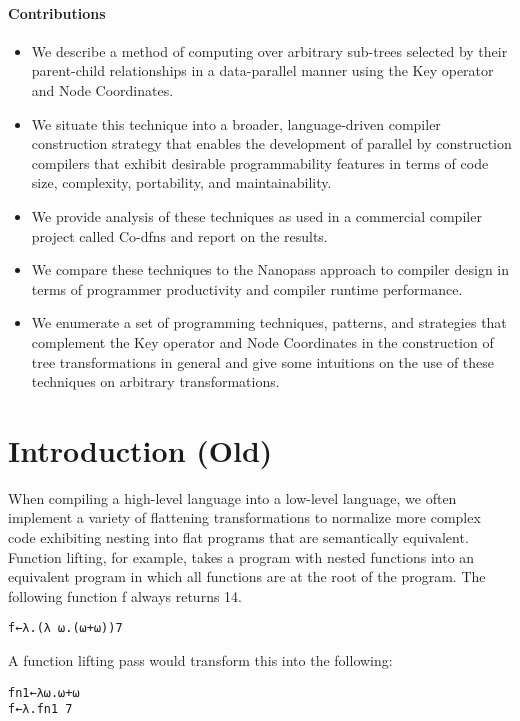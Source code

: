 \documentclass[pldi]{sigplanconf-pldi15}
\begin{document}
\paragraph{Contributions}

\begin{itemize}[noitemsep]
\item We describe a method of computing over arbitrary sub-trees selected by their parent-child 
relationships in a data-parallel manner using the Key operator and Node Coordinates.
\item We situate this technique into a broader, language-driven compiler construction strategy 
that enables the development of parallel by construction compilers that exhibit desirable programmability 
features in terms of code size, complexity, portability, and maintainability. 
\item We provide analysis of these techniques as used in a commercial compiler project called Co-dfns and 
report on the results.
\item We compare these techniques to the Nanopass approach to compiler design in terms of programmer 
productivity and compiler runtime performance. 
\item We enumerate a set of programming techniques, patterns, and strategies that complement the 
Key operator and Node Coordinates in the construction of tree transformations in general and give some 
intuitions on the use of these techniques on arbitrary transformations.
\end{itemize}
\section{Introduction (Old)}

When compiling a high-level language into a low-level language, we often implement a variety of 
flattening transformations to normalize more complex code exhibiting nesting into flat programs 
that are semantically equivalent. Function lifting, for example, takes a program with nested functions 
into an equivalent program in which all functions are at the root of the program. The following function
f always returns 14.

\begin{verbatim}
f←λ.(λ ⍵.(⍵+⍵))7
\end{verbatim}

A function lifting pass would transform this into the following:

\begin{verbatim}
fn1←λ⍵.⍵+⍵
f←λ.fn1 7
\end{verbatim}
\end{document}
